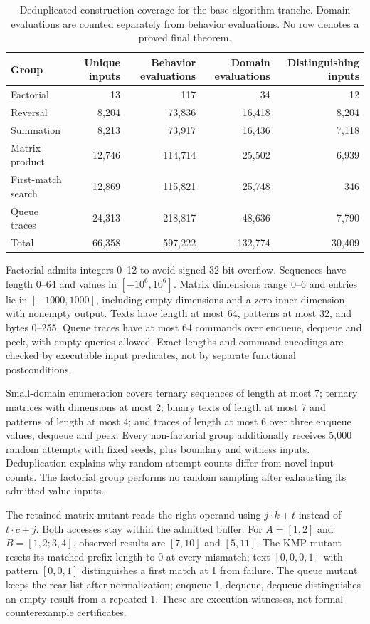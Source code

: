 \documentclass{article}
\begin{document}
\begin{table}[t]
\centering\small
\caption{Deduplicated construction coverage for the base-algorithm tranche. Domain evaluations are counted separately from behavior evaluations. No row denotes a proved final theorem.}
\begin{tabular}{lrrrr}
\toprule
Group & Unique inputs & Behavior evaluations & Domain evaluations & Distinguishing inputs \\
\midrule
Factorial & 13 & 117 & 34 & 12 \\
Reversal & 8,204 & 73,836 & 16,418 & 8,204 \\
Summation & 8,213 & 73,917 & 16,436 & 7,118 \\
Matrix product & 12,746 & 114,714 & 25,502 & 6,939 \\
First-match search & 12,869 & 115,821 & 25,748 & 346 \\
Queue traces & 24,313 & 218,817 & 48,636 & 7,790 \\
\midrule
Total & 66,358 & 597,222 & 132,774 & 30,409 \\
\bottomrule
\end{tabular}
\end{table}

Factorial admits integers 0--12 to avoid signed 32-bit overflow. Sequences have length 0--64 and values in $[-10^6,10^6]$. Matrix dimensions range 0--6 and entries lie in $[-1000,1000]$, including empty dimensions and a zero inner dimension with nonempty output. Texts have length at most 64, patterns at most 32, and bytes 0--255. Queue traces have at most 64 commands over enqueue, dequeue and peek, with empty queries allowed. Exact lengths and command encodings are checked by executable input predicates, not by separate functional postconditions.

Small-domain enumeration covers ternary sequences of length at most 7; ternary matrices with dimensions at most 2; binary texts of length at most 7 and patterns of length at most 4; and traces of length at most 6 over three enqueue values, dequeue and peek. Every non-factorial group additionally receives 5,000 random attempts with fixed seeds, plus boundary and witness inputs. Deduplication explains why random attempt counts differ from novel input counts. The factorial group performs no random sampling after exhausting its admitted value inputs.

The retained matrix mutant reads the right operand using $j\cdot k+t$ instead of $t\cdot c+j$. Both accesses stay within the admitted buffer. For $A=[1,2]$ and $B=[1,2;3,4]$, observed results are $[7,10]$ and $[5,11]$. The KMP mutant resets its matched-prefix length to 0 at every mismatch; text $[0,0,0,1]$ with pattern $[0,0,1]$ distinguishes a first match at 1 from failure. The queue mutant keeps the rear list after normalization; enqueue 1, dequeue, dequeue distinguishes an empty result from a repeated 1. These are execution witnesses, not formal counterexample certificates.
\end{document}
